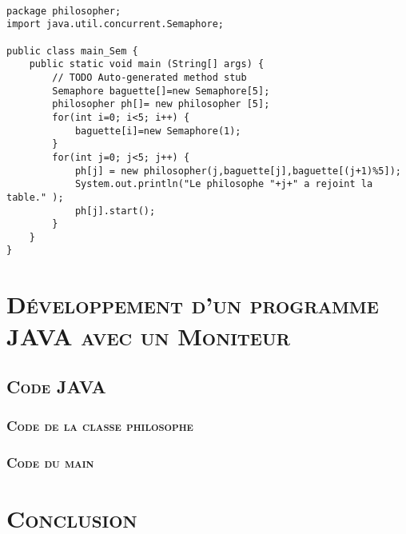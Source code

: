 	\begin{lstlisting}
		
package philosopher;
import java.util.concurrent.Semaphore;

public class main_Sem { 
	public static void main (String[] args) {
		// TODO Auto-generated method stub
		Semaphore baguette[]=new Semaphore[5];
		philosopher ph[]= new philosopher [5];
		for(int i=0; i<5; i++) {
			baguette[i]=new Semaphore(1);
		}
		for(int j=0; j<5; j++) {
			ph[j] = new philosopher(j,baguette[j],baguette[(j+1)%5]);
			System.out.println("Le philosophe "+j+" a rejoint la table." );
			ph[j].start();
		}
	}
}

	\end{lstlisting}



\chapter{\textsc{Développement d'un programme JAVA avec un Moniteur}}
\section{\textsc{Code JAVA}}

\subsection{\textsc{Code de la classe philosophe}}



\subsection{\textsc{Code du main}}


\chapter*{\textsc{Conclusion}}

	\paragraph{}